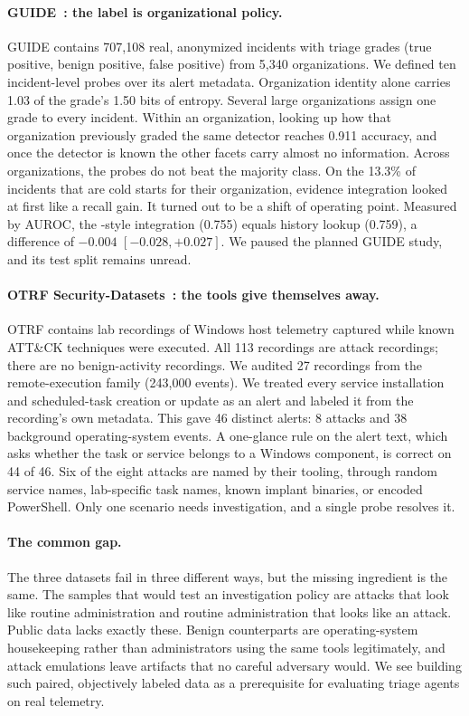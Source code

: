 \paragraph{GUIDE~\citep{guide}: the label is organizational policy.} GUIDE contains 707{,}108 real, anonymized incidents with triage grades (true positive, benign positive, false positive) from 5{,}340 organizations. We defined ten incident-level probes over its alert metadata. Organization identity alone carries 1.03 of the grade's 1.50 bits of entropy. Several large organizations assign one grade to every incident. Within an organization, looking up how that organization previously graded the same detector reaches 0.911 accuracy, and once the detector is known the other facets carry almost no information. Across organizations, the probes do not beat the majority class. On the 13.3\% of incidents that are cold starts for their organization, evidence integration looked at first like a recall gain. It turned out to be a shift of operating point. Measured by AUROC, the \hesp{}-style integration (0.755) equals history lookup (0.759), a difference of $-0.004$ $[-0.028,+0.027]$. We paused the planned GUIDE study, and its test split remains unread.

\paragraph{OTRF Security-Datasets~\citep{otrf}: the tools give themselves away.} OTRF contains lab recordings of Windows host telemetry captured while known ATT\&CK techniques were executed. All 113 recordings are attack recordings; there are no benign-activity recordings. We audited 27 recordings from the remote-execution family (243{,}000 events). We treated every service installation and scheduled-task creation or update as an alert and labeled it from the recording's own metadata. This gave 46 distinct alerts: 8 attacks and 38 background operating-system events. A one-glance rule on the alert text, which asks whether the task or service belongs to a Windows component, is correct on 44 of 46. Six of the eight attacks are named by their tooling, through random service names, lab-specific task names, known implant binaries, or encoded PowerShell. Only one scenario needs investigation, and a single probe resolves it.

\paragraph{The common gap.} The three datasets fail in three different ways, but the missing ingredient is the same. The samples that would test an investigation policy are attacks that look like routine administration and routine administration that looks like an attack. Public data lacks exactly these. Benign counterparts are operating-system housekeeping rather than administrators using the same tools legitimately, and attack emulations leave artifacts that no careful adversary would. We see building such paired, objectively labeled data as a prerequisite for evaluating triage agents on real telemetry.

